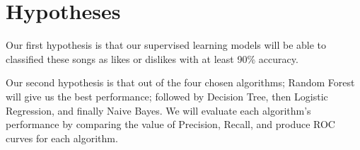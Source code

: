 \section{Hypotheses}
Our first hypothesis is that our supervised learning models will be able to classified these songs as likes or dislikes with at least 90\% accuracy.

Our second hypothesis is that out of the four chosen algorithms; Random Forest will give us the best performance; followed by Decision Tree, then Logistic Regression, and finally Naive Bayes. We will evaluate each algorithm's performance by comparing the value of Precision, Recall, and produce ROC curves for each algorithm.